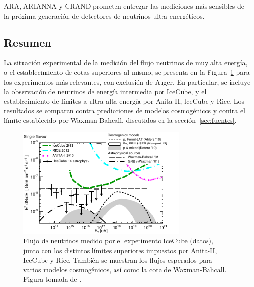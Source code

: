 	ARA, ARIANNA y GRAND prometen entregar las mediciones m\'as sensibles de la pr\'oxima generaci\'on de detectores de neutrinos ultra energ\'eticos.

	\subsection{Resumen}

	La situaci\'on experimental de la medici\'on del flujo neutrinos de muy alta energ\'ia, o el establecimiento de cotas superiores al mismo, se presenta en la Figura~\ref{fig:multimess_noAuger} para los experimentos m\'as relevantes, con exclusi\'on de Auger. En particular, se incluye la observaci\'on de neutrinos de energ\'ia intermedia por IceCube, y el establecimiento de l\'imites a ultra alta energ\'ia por Anita-II, IceCube y Rice. Los resultados se comparan contra predicciones de modelos cosmog\'enicos y contra el l\'imite establecido por Waxman-Bahcall, discutidos en la secci\'on~\ref{sec:fuentes}.

 		\begin{figure}[ht]
 		\begin{center}
 		\includegraphics[width=0.75\textwidth]{fig/introduccion/1510-02050_multimessenger_noAuger}
 		\caption{\label{fig:multimess_noAuger}  Flujo de neutrinos medido por el experimento IceCube (datos), junto con los distintos límites superiores impuestos por Anita-II, IceCube y Rice. Tambi\'en se muestran los flujos esperados para varios modelos cosmog\'enicos, as\'i como la cota de Waxman-Bahcall. Figura tomada de \cite{cite:multimess}.}
 		\end{center}
 	\end{figure}










